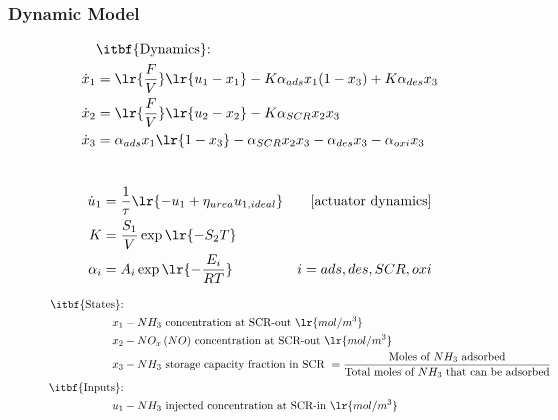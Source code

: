 \subsubsection{Dynamic Model \cite{jain2023diagnostics}}
\begin{figure}[H]
    \begin{minipage}{0.59\textwidth}
        \begin{align*}
        &\text{\itbf{Dynamics}:}\\
            \dot x_1 &= \lr{\frac{F}{V}} \lr{u_1 - x_1} - K \alpha_{ads} x_1 (1 - x_3) + K \alpha_{des} x_3\\
            \dot x_2 &= \lr{\frac{F}{V}} \lr{u_2 - x_2} - K \alpha_{SCR} x_2 x_3\\
            \dot x_3 &= \alpha_{ads} x_1 \lr{ 1 - x_3} - \alpha_{SCR} x_2 x_3 - \alpha_{des} x_3 - \alpha_{oxi} x_3
        \end{align*}
    \end{minipage}
    \begin{minipage}{0.4\textwidth}
        \begin{align*}
            &\\
            \dot u_1 &= \frac{1}{\tau} \lr{ -u_1 +\eta_{urea} u_{1, ideal}} & [\text{actuator dynamics}]\\
            K &= \frac{S_1}{V} \exp\lr{-S_2 T}\\
            \alpha_i &= A_i \exp\lr{-\frac{E_i}{RT}}
            & i = ads, des, SCR, oxi
        \end{align*}
    \end{minipage}
    \begin{minipage}{\textwidth}
        \begin{align*}
            \text{\itbf{States}:}&\\
            x_1 &- NH_3 \text{ concentration at SCR-out } \lr{mol/m^3}\\
            x_2 &- NO_x \, (NO) \text{ concentration at SCR-out } \lr{mol/m^3}\\
            x_3 &- NH_3 \text{ storage capacity fraction in SCR } = \frac{\text{Moles of $NH_3$ adsorbed}}{\text{Total moles of $NH_3$ that can be adsorbed}}\\
            \text{\itbf{Inputs}:}&\\
            u_1 &- NH_3 \text{ injected concentration at SCR-in } \lr{mol/m^3}\\

\end{align*}
\end{minipage}
\end{figure}
